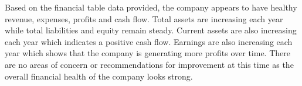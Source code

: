 

Based on the financial table data provided, the company appears to have healthy revenue, expenses, profits and cash flow. Total assets are increasing each year while total liabilities and equity remain steady. Current assets are also increasing each year which indicates a positive cash flow. Earnings are also increasing each year which shows that the company is generating more profits over time. There are no areas of concern or recommendations for improvement at this time as the overall financial health of the company looks strong.